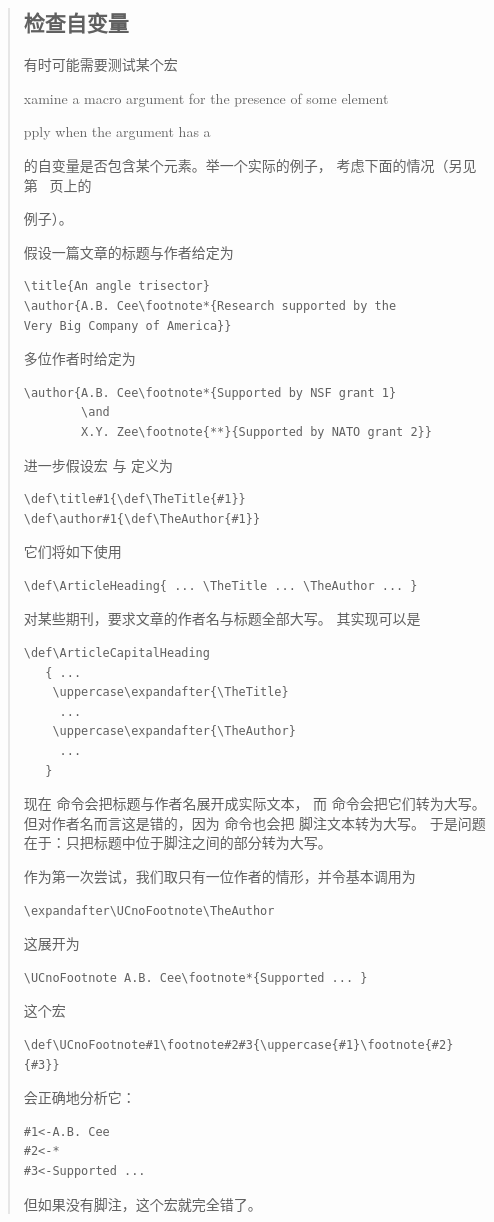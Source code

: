 \documentclass[a4paper]{rapport3}
\def\alt{}\def\altt{}%
\newenvironment{disp}{\begin{quotation}}{\end{quotation}}
\def\howto#1\par{}
\begin{document}
\begin{disp}
\subsection{检查自变量}

有时可能需要测试某个宏
\howto Examine a macro argument for the presence of some element\par
\howto Apply  when the argument has a \par
的自变量是否包含某个元素。举一个实际的例子，
考虑下面的情况（另见第~\pageref{left:display} 页上的 
\alt
例子）。

假设一篇文章的标题与作者给定为
\begin{verbatim}
\title{An angle trisector}
\author{A.B. Cee\footnote*{Research supported by the
Very Big Company of America}}
\end{verbatim}
多位作者时给定为
\begin{verbatim}
\author{A.B. Cee\footnote*{Supported by NSF grant 1}
        \and
        X.Y. Zee\footnote{**}{Supported by NATO grant 2}}
\end{verbatim}
进一步假设宏  与 
定义为
\begin{verbatim}
\def\title#1{\def\TheTitle{#1}}  \def\author#1{\def\TheAuthor{#1}}
\end{verbatim}
它们将如下使用
\begin{verbatim}
\def\ArticleHeading{ ... \TheTitle ... \TheAuthor ... }
\end{verbatim}

对某些期刊，要求文章的作者名与标题全部大写。
其实现可以是
\begin{verbatim}
\def\ArticleCapitalHeading
   { ...
    \uppercase\expandafter{\TheTitle}
     ...
    \uppercase\expandafter{\TheAuthor}
     ...
   }
\end{verbatim}
现在  命令会把标题与作者名展开成实际文本，
而  命令会把它们转为大写。
但对作者名而言这是错的，因为  命令也会把
脚注文本转为大写。
于是问题在于：只把标题中位于脚注之间的部分转为大写。

作为第一次尝试，我们取只有一位作者的情形，并令基本调用为
\begin{verbatim}
\expandafter\UCnoFootnote\TheAuthor
\end{verbatim}
这展开为
\begin{verbatim}
\UCnoFootnote A.B. Cee\footnote*{Supported ... }
\end{verbatim}
这个宏
\begin{verbatim}
\def\UCnoFootnote#1\footnote#2#3{\uppercase{#1}\footnote{#2}{#3}}
\end{verbatim}
会正确地分析它：
\begin{verbatim}
#1<-A.B. Cee
#2<-*
#3<-Supported ...
\end{verbatim}
但如果没有脚注，这个宏就完全错了。


\end{disp}
\end{document}
